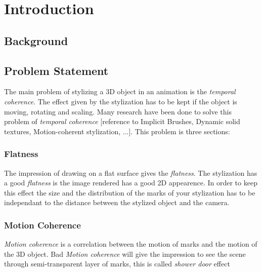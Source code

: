 \chapter{Introduction}


\section{Background}

\section{Problem Statement}

The main problem of stylizing a 3D object in an animation is the \textit{temporal coherence}. The effect given by the stylization has to be kept if the object is moving, rotating and scaling. Many research have been done to solve this problem of \textit{temporal coherence} [reference to Implicit Brushes, Dynamic solid textures, Motion-coherent stylization, ...]. This problem is three sections:

\subsection{Flatness}

The impression of drawing on a flat surface gives the \textit{flatness}. The stylization has a good \textit{flatness} is the image rendered has a good 2D appearence. In order to keep this effect the size and the distribution of the marks of your stylization has to be independant to the distance between the stylized object and the camera.

\subsection{Motion Coherence}

\textit{Motion coherence} is a correlation between the motion of marks and the motion of the 3D object. Bad \textit{Motion coherence} will give the impression to see the scene through semi-transparent layer of marks, this is called \textit{shower door} effect%
